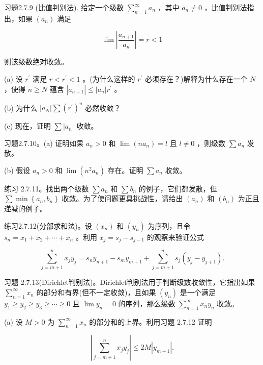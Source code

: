 习题2.7.9 (比值判别法). 给定一个级数 \(\mathop{\sum }\limits_{{n = 1}}^{\infty }{a}_{n}\) ，其中 \({a}_{n} \neq  0\) ，比值判别法指出，如果 \(\left( {a}_{n}\right)\) 满足

\[
\lim \left| \frac{{a}_{n + 1}}{{a}_{n}}\right|  = r < 1
\]

则该级数绝对收敛。

(a) 设 \({r}^{\prime }\) 满足 \(r < {r}^{\prime } < 1\) 。(为什么这样的 \({r}^{\prime }\) 必须存在？)解释为什么存在一个 \(N\) ，使得 \(n \geq  N\) 蕴含 \(\left| {a}_{n + 1}\right|  \leq  \left| {a}_{n}\right| {r}^{\prime }\) 。

(b) 为什么 \(\left| {a}_{N}\right| \sum {\left( {r}^{\prime }\right) }^{n}\) 必然收敛？

(c) 现在，证明 \(\sum \left| {a}_{n}\right|\) 收敛。

习题2.7.10。(a) 证明如果 \({a}_{n} > 0\) 和 \(\lim \left( {n{a}_{n}}\right)  = l\) 且 \(l \neq  0\) ，则级数 \(\sum {a}_{n}\) 发散。

(b) 假设 \({a}_{n} > 0\) 和 \(\lim \left( {{n}^{2}{a}_{n}}\right)\) 存在。证明 \(\sum {a}_{n}\) 收敛。

练习 2.7.11。找出两个级数 \(\sum {a}_{n}\) 和 \(\sum {b}_{n}\) 的例子，它们都发散，但 \(\sum \min \left\{  {{a}_{n},{b}_{n}}\right\}\) 收敛。为了使问题更具挑战性，请给出 \(\left( {a}_{n}\right)\) 和 \(\left( {b}_{n}\right)\) 为正且递减的例子。

练习2.7.12(分部求和法)。设 \(\left( {x}_{n}\right)\) 和 \(\left( {y}_{n}\right)\) 为序列，且令 \({s}_{n} = {x}_{1} + {x}_{2} + \cdots  + {x}_{n}\) 。利用 \({x}_{j} = {s}_{j} - {s}_{j - 1}\) 的观察来验证公式

\[
\mathop{\sum }\limits_{{j = m + 1}}^{n}{x}_{j}{y}_{j} = {s}_{n}{y}_{n + 1} - {s}_{m}{y}_{m + 1} + \mathop{\sum }\limits_{{j = m + 1}}^{n}{s}_{j}\left( {{y}_{j} - {y}_{j + 1}}\right) .
\]

习题 2.7.13(Dirichlet判别法)。Dirichlet判别法用于判断级数收敛性，它指出如果 \(\mathop{\sum }\limits_{{n = 1}}^{\infty }{x}_{n}\) 的部分和有界(但不一定收敛)，且如果 \(\left( {y}_{n}\right)\) 是一个满足 \({y}_{1} \geq  {y}_{2} \geq  {y}_{3} \geq  \cdots  \geq  0\) 且 \(\lim {y}_{n} = 0\) 的序列，那么级数 \(\mathop{\sum }\limits_{{n = 1}}^{\infty }{x}_{n}{y}_{n}\) 收敛。

(a) 设 \(M > 0\) 为 \(\mathop{\sum }\limits_{{n = 1}}^{\infty }{x}_{n}\) 的部分和的上界。利用习题 2.7.12 证明

\[
\left| {\mathop{\sum }\limits_{{j = m + 1}}^{n}{x}_{j}{y}_{j}}\right|  \leq  {2M}\left| {y}_{m + 1}\right| .
\]

